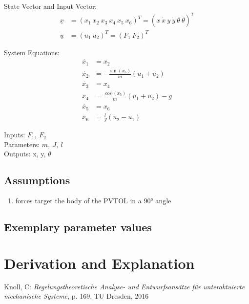 \documentclass[10pt,a4paper]{article}
\begin{document}
	State Vector and Input Vector:
	\begin{align*}
		\underline{x} &= (x_1 \ x_2 \ x_3 \ x_4 \ x_5 \ x_6)^T = (x \ \dot{x} \ y \ \dot{y} \ \theta \ \dot{\theta})^T \\
		\underline{u} &= (u_1 \ u_2)^T = (F_1 \ F_2)^T
	\end{align*}

	\noindent System Equations:	
	\begin{subequations}
	\begin{align}
		\dot{x_1} &= x_2 	\\ 
		\dot{x_2} &= -\frac{\sin(x_5)}{m}(u_1 + u_2)  \\
		\dot{x_3} &= x_4 \\
		\dot{x_4} &= \frac{\cos(x_5)}{m}(u_1 + u_2) - g \\
		\dot{x_5} &= x_6 \\
		\dot{x_6} &= \frac{l}{J}(u_2 - u_1)
	\end{align}
	\end{subequations}

	\noindent
	Inputs: $F_1,~F_2$ 
	\\
	Parameters: $m, ~J, ~l$ %
	\\
	Outputs:  x, y, $\theta$%
	
	
	\subsection{Assumptions} %
		\begin{enumerate} %
			\item forces target the body of the PVTOL in a 90° angle
		\end{enumerate}
	
	
	\subsection{Exemplary parameter values}
	

	
	\section{Derivation and Explanation} %
	
	
	\begin{thebibliography}{10}		
		Knoll, C: 
		\textit{Regelungstheoretische Analyse- und Entwurfsansätze für unteraktuierte mechanische Systeme}, p. 169, TU Dresden, 2016
	\end{thebibliography}
\end{document}
